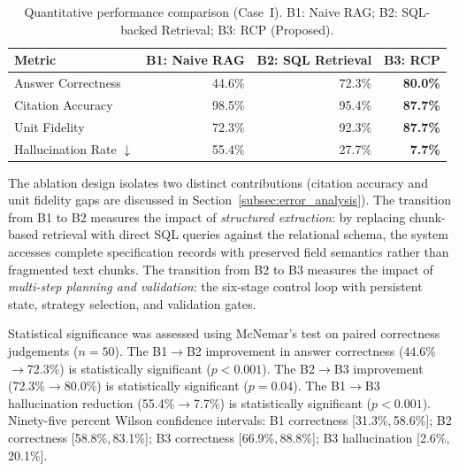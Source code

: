\documentclass[largeformat]{interact}
\begin{document}
\begin{table}[h]
    \centering
    \caption{Quantitative performance comparison (Case~I). B1: Naive RAG; B2: SQL-backed Retrieval; B3: RCP (Proposed).}
    \label{tab:performance_comparison}
    \small
    \setlength{\tabcolsep}{8pt}
    \renewcommand{\arraystretch}{1.1}
    \begin{tabular}{@{}lrrr@{}}
        \toprule
        \textbf{Metric} & \textbf{B1: Naive RAG} & \textbf{B2: SQL Retrieval} & \textbf{B3: RCP} \\
        \midrule
         Answer Correctness              & 44.6\% & 72.3\% & \textbf{80.0\%} \\
        Citation Accuracy               & 98.5\% & 95.4\% & \textbf{87.7\%} \\
        Unit Fidelity                   & 72.3\% & 92.3\% & \textbf{87.7\%} \\
        Hallucination Rate $\downarrow$ & 55.4\% & 27.7\% & \textbf{7.7\%} \\
        \bottomrule
    \end{tabular}
\end{table}

The ablation design isolates two distinct contributions (citation accuracy and unit fidelity gaps are discussed in Section~\ref{subsec:error_analysis}). The transition from B1 to B2 measures the impact of \emph{structured extraction}: by replacing chunk-based retrieval with direct SQL queries against the relational schema, the system accesses complete specification records with preserved field semantics rather than fragmented text chunks. The transition from B2 to B3 measures the impact of \emph{multi-step planning and validation}: the six-stage control loop with persistent state, strategy selection, and validation gates.

Statistical significance was assessed using McNemar's test on paired correctness judgements ($n = 50$). The B1$\rightarrow$B2 improvement in answer correctness (44.6\%$\rightarrow$72.3\%) is statistically significant ($p < 0.001$). The B2$\rightarrow$B3 improvement (72.3\%$\rightarrow$80.0\%) is statistically significant ($p = 0.04$). The B1$\rightarrow$B3 hallucination reduction (55.4\%$\rightarrow$7.7\%) is statistically significant ($p < 0.001$). Ninety-five percent Wilson confidence intervals: B1 correctness [31.3\%,\,58.6\%]; B2 correctness [58.8\%,\,83.1\%]; B3 correctness [66.9\%,\,88.8\%]; B3 hallucination [2.6\%,\,20.1\%].
\end{document}
